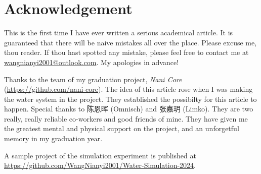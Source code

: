 \section*{Acknowledgement}
\begin{redacted}
This is the first time I have ever written a serious academical article.
It is guaranteed that there will be naive mistakes all over the place.
Please excuse me, thou reader.
If thou hast spotted any mistake, please feel free to contact me at \url{wangnianyi2001@outlook.com}.
My apologies in advance!

Thanks to the team of my graduation project, \emph{Nani Core} (\url{https://github.com/nani-core}).
The idea of this article rose when I was making the water system in the project.
They established the possibilty for this article to happen.
Special thanks to 陈恩晖 (Omnisch) and 张嘉玥 (Limko).
They are two really, really reliable co-workers and good friends of mine.
They have given me the greatest mental and physical support on the project, and an unforgetful memory in my graduation year.

A sample project of the simulation experiment is published at \url{https://github.com/WangNianyi2001/Water-Simulation-2024}.
\end{redacted}

\printbibliography

